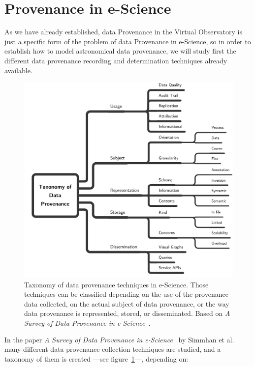 	\section{Provenance in e-Science} %
	\label{sec:provenance_in_escience}
	
		As we have already established, data Provenance in the
		Virtual Observatory is just a specific form of the
		problem of data Provenance in e-Science, so in order
		to establish how to model astronomical data provenance,
		we will study first the different data provenance
		recording and determination techniques already
		available.
		
		\begin{figure}[tbp]
			\centering
				\includegraphics[width=\columnwidth]
				{fig/DataProvenanceTaxonomy.pdf}
			\caption[
				Taxonomy of data provenance techniques in
				e-Science
			]
			{
				Taxonomy of data provenance techniques in
				e-Science. Those techniques can be classified
				depending on the use of the provenance data
				collected, on the actual subject of data
				provenance, or the way data provenance is
				represented, stored, or disseminated. Based on
				\emph{A Survey of Data Provenance in
				e-Science}~\cite{SimPlaGan0503A-Survey}.
			}
			\label{fig:fig_DataProvenanceTaxonomy}
		\end{figure}
		
		In the paper \emph{A Survey of Data Provenance in
		e-Science}~\cite{SimPlaGan0503A-Survey} by Simmhan et al.
		many different data provenance collection techniques are
		studied, and a taxonomy of them is created ---see
		figure~\ref{fig:fig_DataProvenanceTaxonomy}---, depending
		on:
		
